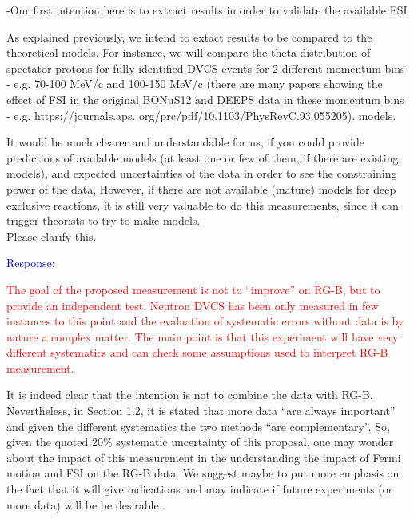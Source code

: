   
 \begin{itemize}
  {\color{red} \item  -Our first intention here is to extract results in order 
     to validate the available FSI
  \item  As explained previously, we intend to extact results to be compared to 
     the theoretical models. For instance, we will compare the 
       theta-distribution of spectator protons for fully identified DVCS events 
       for 2 different momentum bins - e.g. 70-100 MeV/c and 100-150 MeV/c 
       (there are many papers showing the effect of FSI in the original
 BONuS12 and DEEPS data in these momentum bins - e.g. https://journals.aps.
 org/prc/pdf/10.1103/PhysRevC.93.055205).
 models.} \newline
 
 It would be much clearer and understandable for us, if you could provide 
       predictions of available models (at least one or few of them, if there 
       are existing models), and expected uncertainties of the data in order to 
       see the constraining power of the data, However, if there are not 
       available (mature) models for deep exclusive reactions, it is still very 
       valuable to do this measurements, since it can trigger theorists to try 
       to make models. \\
  Please clarify this.

  
  \textcolor{blue}{Response: }
  
  \textcolor{red}{
  \item   The goal of the proposed measurement is not to ``improve'' on RG-B, 
     but to provide an independent test. Neutron DVCS has been only measured in 
       few instances to this point and the evaluation of systematic errors 
       without data is by nature a complex matter. The main point is that this 
       experiment will have very different systematics and can check some 
       assumptions used to interpret RG-B measurement.
  }
  \newline
  
  It is indeed clear that the intention is not to combine the data with RG-B.  
       Nevertheless, in Section 1.2, it is stated that more data ``are always 
       important'' and given the different systematics the two methods ``are 
       complementary''. So, given the quoted 20\% systematic uncertainty of 
       this proposal, one may wonder about the impact of this measurement in 
       the understanding the impact of Fermi motion and FSI on the RG-B data.
  We suggest maybe to put more emphasis on the fact that it will give 
       indications and may indicate if future experiments (or more data) will 
       be be desirable.
  

\end{itemize}
